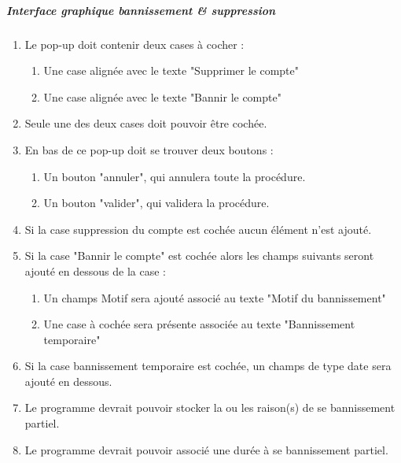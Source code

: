 \documentclass[10pt,a4paper]{report}
\begin{document}
	\subparagraph{Interface graphique bannissement \& suppression}\label{del} 
		\begin{enumerate}

			\item Le pop-up doit contenir deux cases à cocher :
			\begin{enumerate}[label=\arabic*.]
				\item Une case alignée avec le texte "Supprimer le compte"
				\item Une case alignée avec le texte "Bannir le compte"
			\end{enumerate} 
			\item Seule une des deux cases doit pouvoir être cochée.
			\item En bas de ce pop-up doit se trouver deux boutons :
			\begin{enumerate}[label=\arabic*.]
				\item Un bouton "annuler", qui annulera toute la procédure.
				\item Un bouton "valider", qui validera la procédure.
			\end{enumerate} 
			\item Si la case suppression du compte est cochée aucun élément n'est ajouté.
			\item Si la case "Bannir le compte" est cochée alors les champs suivants seront ajouté en dessous de la case :
			\begin{enumerate}[label=\arabic*.]
				\item Un champs Motif sera ajouté associé au texte "Motif du bannissement"
				\item Une case à cochée sera présente associée au texte "Bannissement temporaire"
			\end{enumerate} 
			\item Si la case bannissement temporaire est cochée, un champs de type date sera ajouté en dessous. 
			\item Le programme devrait pouvoir stocker la ou les raison(s) de se bannissement partiel.
			\item Le programme devrait pouvoir associé une durée à se bannissement partiel.
		\end{enumerate}
	
\end{document}
